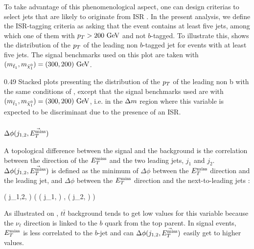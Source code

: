         To take advantage of this phenomenological aspect, one can design criterias to
        select jets that are likely to originate from ISR \cite{ISRGluinoTevatron, ISRtagging}.
        In the present analysis, we define the ISR-tagging criteria as asking that
        the event contains at least five jets, among which one of them with $p_T > 200 ~\text{GeV}$
        and not $b$-tagged. To illustrate this, 
        shows the distribution of the $p_T$ of the leading non $b$-tagged jet for
        events with at least five jets. The signal benchmarks used on this plot are
        taken with $(m_{\tilde{t}_1},m_{\tilde{\chi}_1^0}) = (300,200)~\text{GeV}$.

                     {0.49}
                     {Stacked plots presenting the distribution of the $p_T$
                     of the leading non b
                     with the same conditions of ,
                     except that the signal benchmarks used are with $(m_{\tilde{t}_1},
                     m_{\tilde{\chi}_1^0}) = (300,200)~\text{GeV}$, i.e. in the $\Delta m$ region where
                     this variable is expected to be discriminant due to
                     the presence of an ISR.}

        \subsubsection{$\Delta \phi( j_{1,2}, \vec{E_T^\text{miss}} )$ }

        A topological difference between the signal and the background is the correlation
        between the direction of the $E_T^\text{miss}$ and the two leading jets, $j_1$ and $j_2$.
        $\Delta \phi( j_{1,2}, \vec{E_T^\text{miss}} )$ is defined as the minimum of $\Delta \phi$
        between the $E_T^\text{miss}$ direction and the leading jet, and $\Delta \phi$ between the
        $E_T^\text{miss}$ direction and the next-to-leading jets :

        {
            \Delta \phi( j_{1,2}, \vec{\MET} )
            (
                \Delta \phi( j_1, \vec{\MET} )
                ,
                \Delta \phi( j_2, \vec{\MET} )
            )
        }

        As illustrated on ,
        $t\bar{t}$ background tends to get low values for this variable because the
        $\nu_{\ell}$ direction is linked to the $b$ quark from the top parent. In signal
        events, $E_T^\text{miss}$ is less correlated to the $b$-jet and can $\Delta \phi( j_{1,2},
        \vec{E_T^\text{miss}} )$ easily get to higher values.

